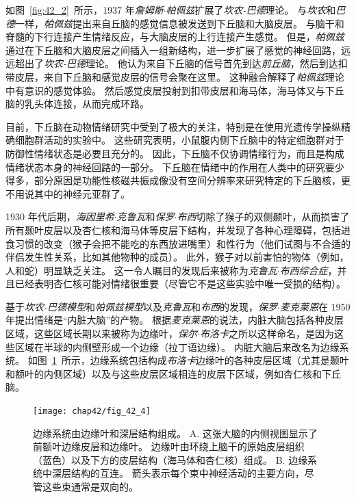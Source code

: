 如图~\ref{fig:42_2}~所示，1937 年\textit{詹姆斯$\cdot$帕佩兹}扩展了\textit{坎农-巴德}理论。
与\textit{坎农}和\textit{巴德}一样，\textit{帕佩兹}提出来自丘脑的感觉信息被发送到下丘脑和大脑皮层。
与脑干和脊髓的下行连接产生情绪反应，与大脑皮层的上行连接产生感觉。
但是，\textit{帕佩兹}通过在下丘脑和大脑皮层之间插入一组新结构，进一步扩展了感觉的神经回路，远远超出了\textit{坎农-巴德}理论。
他认为来自下丘脑的信号首先到达\textit{前丘脑}，然后到达扣带皮层，来自下丘脑和感觉皮层的信号会聚在这里。
这种融合解释了\textit{帕佩兹}理论中有意识的感觉体验。
然后感觉皮层投射到扣带皮层和海马体，海马体又与下丘脑的乳头体连接，从而完成环路。


目前，下丘脑在动物情绪研究中受到了极大的关注，特别是在使用光遗传学操纵精确细胞群活动的实验中。
这些研究表明，小鼠腹内侧下丘脑中的特定细胞群对于防御性情绪状态是必要且充分的。
因此，下丘脑不仅协调情绪行为，而且是构成情绪状态本身的神经回路的一部分。
下丘脑在情绪中的作用在人类中的研究要少得多，部分原因是功能性核磁共振成像没有空间分辨率来研究特定的下丘脑核，更不用说其中的神经元亚群了。


1930 年代后期，\textit{海因里希$\cdot$克鲁瓦}和\textit{保罗$\cdot$布西}切除了猴子的双侧颞叶，从而损害了所有颞叶皮层以及杏仁核和海马体等皮层下结构，并发现了各种心理障碍，包括进食习惯的改变（猴子会把不能吃的东西放进嘴里）和性行为（他们试图与不合适的伴侣发生性关系，比如其他物种的成员）。
此外，猴子对以前害怕的物体（例如，人和蛇）明显缺乏关注。
这一令人瞩目的发现后来被称为\textit{克鲁瓦$\cdot$布西综合症}，并且已经表明杏仁核可能对情绪很重要（尽管它不是这些实验中唯一受损的结构）。


基于\textit{坎农-巴德模型}和\textit{帕佩兹模型}以及\textit{克鲁瓦}和\textit{布西}的发现，\textit{保罗$\cdot$麦克莱恩}在 1950 年提出情绪是“内脏大脑”的产物。
根据\textit{麦克莱恩}的说法，内脏大脑包括各种皮层区域，这些区域长期以来被称为边缘叶，\textit{保尔$\cdot$布洛卡}之所以这样命名，是因为这些区域在半球的内侧壁形成一个边缘（拉丁语边缘）。
内脏大脑后来改名为边缘系统。
如图~\ref{fig:42_4}~所示，边缘系统包括构成\textit{布洛卡}边缘叶的各种皮层区域（尤其是颞叶和额叶的内侧区域）以及与这些皮层区域相连的皮层下区域，例如杏仁核和下丘脑。


\begin{figure}[htbp]
	\centering
	\texttt{[image: chap42/fig\_42\_4]}
	\caption{边缘系统由边缘叶和深层结构组成\cite{nieuwenhuys2007human}。
		A. 这张大脑的内侧视图显示了前额叶边缘皮层和边缘叶。
		边缘叶由环绕上脑干的原始皮层组织（蓝色）以及下方的皮层结构（海马体和杏仁核）组成。
		B. 边缘系统中深层结构的互连。
		箭头表示每个束中神经活动的主要方向，尽管这些束通常是双向的。}
	\label{fig:42_4}
\end{figure}


